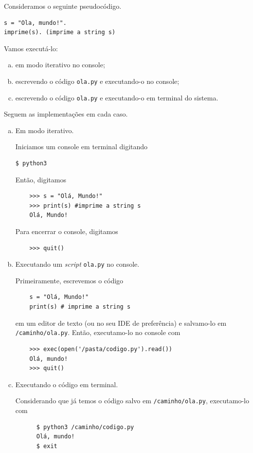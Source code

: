 \documentclass[12pt]{article}
\begin{document}
\begin{ex}
  Consideramos o seguinte pseudocódigo.
\begin{verbatim}
s = "Ola, mundo!".
imprime(s). (imprime a string s)
\end{verbatim}
  Vamos executá-lo:
  \begin{enumerate}[a)]
  \item em modo iterativo no console;
  \item escrevendo o código \verb+ola.py+ e executando-o no console;
  \item escrevendo o código \verb+ola.py+ e executando-o em terminal do sistema.
  \end{enumerate}
  
   Seguem as implementações em cada caso.

  \begin{enumerate}[a)]
  \item Em modo iterativo.

    Iniciamos um console {\python} em terminal digitando
\begin{verbatim}
$ python3
\end{verbatim}
    Então, digitamos
    \begin{lstlisting}
    >>> s = "Olá, Mundo!"
    >>> print(s) #imprime a string s
    Olá, Mundo!
    \end{lstlisting}
    Para encerrar o console, digitamos
    \begin{lstlisting}
    >>> quit()
    \end{lstlisting}
    
  \item Executando um {\it script} \verb+ola.py+ no console.

    Primeiramente, escrevemos o código
    \begin{lstlisting}
    s = "Olá, Mundo!"
    print(s) # imprime a string s
    \end{lstlisting}
    em um editor de texto (ou no seu IDE de preferência) e salvamo-lo em \verb+/caminho/ola.py+. Então, executamo-lo no console {\python} com
    \begin{lstlisting}
    >>> exec(open('/pasta/codigo.py').read())
    Olá, mundo!
    >>> quit()
    \end{lstlisting}

  \item Executando o código em terminal.

    Considerando que já temos o código salvo em \verb+/caminho/ola.py+, executamo-lo com
    \begin{lstlisting}
      $ python3 /caminho/codigo.py
      Olá, mundo!
      $ exit
    \end{lstlisting}
  \end{enumerate}
\end{ex}
\end{document}
